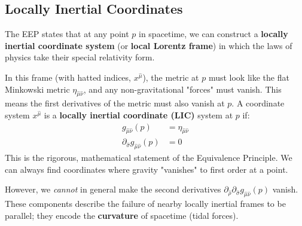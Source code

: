 \documentclass[11pt, a4paper]{report}
\begin{document}
\subsection*{Locally Inertial Coordinates}
The EEP states that at any point $p$ in spacetime, we can construct a \textbf{locally inertial coordinate system} (or \textbf{local Lorentz frame}) in which the laws of physics take their special relativity form.

In this frame (with hatted indices, $x^{\hat{\mu}}$), the metric at $p$ must look like the flat Minkowski metric $\eta_{\hat{\mu}\hat{\nu}}$, and any non-gravitational "forces" must vanish. This means the first derivatives of the metric must also vanish at $p$.
A coordinate system $x^{\hat{\mu}}$ is a \textbf{locally inertial coordinate (LIC)} system at $p$ if:
\begin{align}
    g_{\hat{\mu}\hat{\nu}}(p) &= \eta_{\hat{\mu}\hat{\nu}} \\
    \partial_{\hat{\sigma}} g_{\hat{\mu}\hat{\nu}}(p) &= 0
\end{align}
This is the rigorous, mathematical statement of the Equivalence Principle. We can always find coordinates where gravity "vanishes" to first order at a point.

However, we \emph{cannot} in general make the second derivatives $\partial_{\hat{\rho}}\partial_{\hat{\sigma}} g_{\hat{\mu}\hat{\nu}}(p)$ vanish. These components describe the failure of nearby locally inertial frames to be parallel; they encode the \textbf{curvature} of spacetime (tidal forces).
\end{document}

